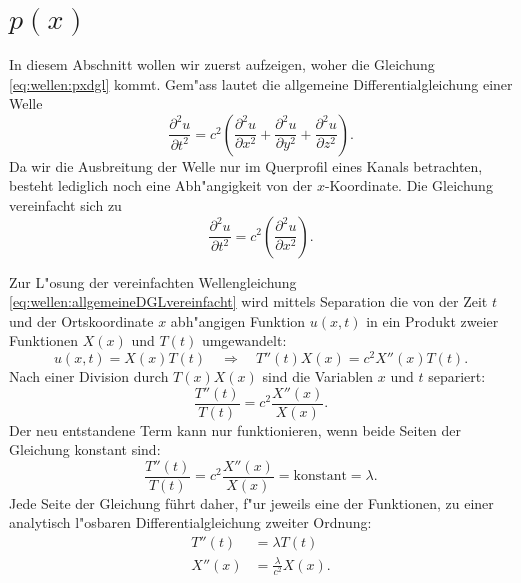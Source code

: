 \section{\texorpdfstring{$p(x)$}{p(x)}}
In diesem Abschnitt wollen wir zuerst aufzeigen, woher die Gleichung 
\eqref{eq:wellen:pxdgl} kommt. Gem"ass \cite{wellen:smirnow2} lautet 
die allgemeine Differentialgleichung einer Welle
%
\begin{equation*}
	\frac{\partial^2 u}{\partial t^2}
	=
	c^2
	\left(
		\frac{\partial^2 u}{\partial x^2} 
		+ \frac{\partial^2 u}{\partial y^2} 
		+ \frac{\partial^2 u}{\partial z^2}
	\right).
	\label{eq:wellen:allgemeineDGL}
\end{equation*}
Da wir die Ausbreitung der Welle nur im Querprofil eines Kanals betrachten, 
besteht lediglich noch eine Abh"angigkeit von der $x$-Koordinate. Die Gleichung 
vereinfacht sich zu
\begin{equation}
	\frac{\partial^2 u}{\partial t^2}
	=
	c^2
	\left(
		\frac{\partial^2 u}{\partial x^2} 
	\right).
	\label{eq:wellen:allgemeineDGLvereinfacht}
\end{equation}

Zur L"osung der vereinfachten Wellengleichung 
\eqref{eq:wellen:allgemeineDGLvereinfacht} wird mittels Separation die von der 
Zeit $t$ und der Ortskoordinate $x$ abh"angigen Funktion $u(x,t)$ in ein 
Produkt zweier Funktionen $X(x)$ und $T(t)$ umgewandelt:
\begin{equation*}
	u (x,t) = X(x) T(t)
	\quad
	\Rightarrow\quad T''(t) X(x) = c^2 X''(x)T(t).
\end{equation*}
Nach einer Division durch $T(x)X(x)$ sind die Variablen $x$ und $t$ separiert:
\begin{equation*}
	\frac{T''(t)}{T(t)}
	=
	c^2 \frac{X''(x)}{X(x)}.
\end{equation*}
Der neu entstandene Term kann nur funktionieren, wenn beide Seiten der 
Gleichung konstant sind:
\begin{equation*}
	\frac{T''(t)}{T(t)}
	=
	c^2 \frac{X''(x)}{X(x)} = \text{konstant} = \lambda.
\end{equation*}
Jede Seite der Gleichung führt daher, f"ur jeweils eine der Funktionen, zu 
einer analytisch l"osbaren Differentialgleichung zweiter Ordnung:
\begin{align*}
	T''(t) &= \lambda T(t) \\
	X''(x) &= \frac{\lambda}{c^2}X(x).
\end{align*}

